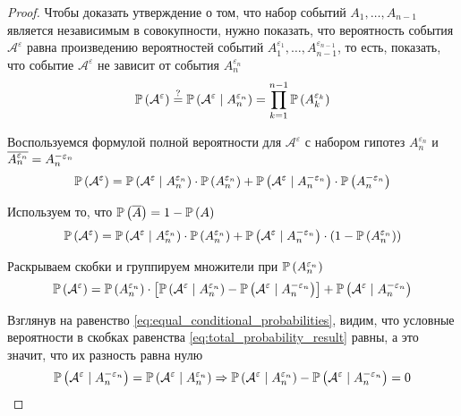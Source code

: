 \begin{proof}
    Чтобы доказать утверждение о том,
    что набор событий $A_1, \dots, A_{n-1}$ является независимым в совокупности,
    нужно показать, что вероятность события $\mathcal{A}^{\varepsilon}$ равна
    произведению вероятностей событий
    $A_1^{\varepsilon_1}, \dots, A_{n-1}^{\varepsilon_{n-1}}$,
    то есть, показать, что событие $\mathcal{A}^{\varepsilon}$
    не зависит от события $A_n^{\varepsilon_n}$
    \begin{equation}\label{eq:main_condition}
        \mathbb{P}\left( \mathcal{A}^{\varepsilon} \right)\stackrel{\rm ?}{=}
        \mathbb{P}\left( \mathcal{A}^{\varepsilon}\mid A_n^{\varepsilon_n} \right)
        =\prod_{k=1}^{n-1} \mathbb{P}\left( A_{k}^{\varepsilon_k} \right)
    \end{equation}

    Воспользуемся формулой полной вероятности для $\mathcal{A}^{\varepsilon}$
    с набором гипотез $A_n^{\varepsilon_n}$ и
    $\overline{A_n^{\varepsilon_n}}=A_n^{-\varepsilon_n}$
    $$\mathbb{P}\left( \mathcal{A}^{\varepsilon} \right)
    =\mathbb{P}\left( \mathcal{A}^{\varepsilon}\mid A_n^{\varepsilon_n} \right)
        \cdot\mathbb{P}\left( A_n^{\varepsilon_n} \right)
    +\mathbb{P}\left( \mathcal{A}^{\varepsilon}\mid A_n^{-\varepsilon_n} \right)
        \cdot\mathbb{P}\left( A_n^{-\varepsilon_n} \right)$$

    Используем то, что $\mathbb{P}\left( \overline{A} \right)=1-\mathbb{P}\left( A \right)$
    $$\mathbb{P}\left( \mathcal{A}^{\varepsilon} \right)
    =\mathbb{P}\left( \mathcal{A}^{\varepsilon}\mid A_n^{\varepsilon_n} \right)
        \cdot\mathbb{P}\left( A_n^{\varepsilon_n} \right)
    +\mathbb{P}\left( \mathcal{A}^{\varepsilon}\mid A_n^{-\varepsilon_n} \right)
        \cdot\left(1-\mathbb{P}\left( A_n^{\varepsilon_n} \right)\right)$$

    Раскрываем скобки и группируем множители при
    $\mathbb{P}\left( A_n^{\varepsilon_n} \right)$
    \begin{equation}\label{eq:total_probability_result}
    \mathbb{P}\left( \mathcal{A}^{\varepsilon} \right)
    =\mathbb{P}\left( A_n^{\varepsilon_n} \right)\cdot
        \left[
            \mathbb{P}\left( \mathcal{A}^{\varepsilon}\mid A_n^{\varepsilon_n} \right)
            -\mathbb{P}\left( \mathcal{A}^{\varepsilon}\mid A_n^{-\varepsilon_n} \right)
        \right]
    +\mathbb{P}\left( \mathcal{A}^{\varepsilon}\mid A_n^{-\varepsilon_n} \right)
    \end{equation}

    Взглянув на равенство \eqref{eq:equal_conditional_probabilities}, видим,
    что условные вероятности в скобках равенства
    \eqref{eq:total_probability_result} равны,
    а это значит, что их разность равна нулю
    $$\mathbb{P}\left( \mathcal{A}^{\varepsilon}\mid A_n^{-\varepsilon_n} \right)
    =\mathbb{P}\left( \mathcal{A}^{\varepsilon}\mid A_n^{\varepsilon_n} \right)
    \Rightarrow
    \mathbb{P}\left( \mathcal{A}^{\varepsilon}\mid A_n^{\varepsilon_n} \right)
    -\mathbb{P}\left( \mathcal{A}^{\varepsilon}\mid A_n^{-\varepsilon_n} \right)=0
    $$


\end{proof}
